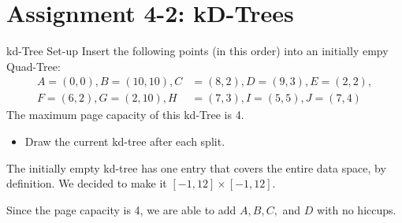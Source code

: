 \documentclass{beamer}
\begin{document}
	\section{Assignment 4-2: kD-Trees}
		\begin{frame}{kd-Tree Set-up}
		Insert the following points (in this order) into an initially empy Quad-Tree:
		\begin{align*}
			A = (0,0), B = (10,10), C &= (8,2), D = (9,3), E = (2,2),\\
			F = (6,2), G = (2,10), H &= (7,3), I = (5,5), J = (7,4)
		\end{align*}
		The maximum page capacity of this kd-Tree is 4.
		\begin{itemize}
			\item Draw the current kd-tree after each split.
		\end{itemize}
	\end{frame}
		\begin{frame}{The initially empty kd-tree has one entry that covers the entire data space, by definition. We decided to make it $[-1,12]\times [-1,12]$.}
		\begin{center}
		\end{center}
		
	\end{frame}
	\begin{frame}{Since the page capacity is 4, we are able to add $A,B,C,$ and $D$ with no hiccups.}
		\begin{center}
		\end{center}
	\end{frame}
\end{document}
